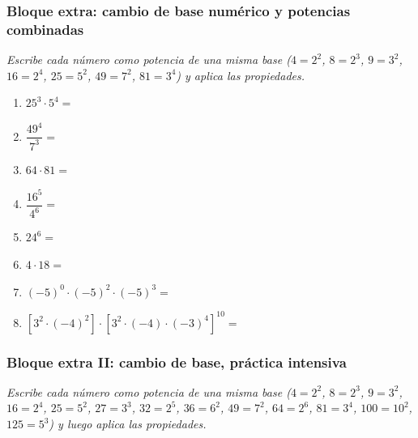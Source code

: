 \documentclass[12pt, letterpaper]{article}
\begin{document}
\subsubsection*{Bloque extra: cambio de base numérico y potencias combinadas}
\textit{Escribe cada número como potencia de una misma base ($4 = 2^2$, $8 = 2^3$, $9 = 3^2$, $16 = 2^4$, $25 = 5^2$, $49 = 7^2$, $81 = 3^4$) y aplica las propiedades.}

\begin{enumerate}[leftmargin=*, start=58]
  \item \facil{} $25^3 \cdot 5^4 =$

  \item \facil{} $\dfrac{49^4}{7^3} =$

  \item \medio{} $64 \cdot 81 =$

  \item \medio{} $\dfrac{16^5}{4^6} =$

  \item \medio{} $24^6 =$

  \item \medio{} $4 \cdot 18 =$

  \item \medio{} $(-5)^0 \cdot (-5)^2 \cdot (-5)^3 =$

  \item \dificil{} $\left[3^2 \cdot (-4)^2\right] \cdot \left[3^2 \cdot (-4) \cdot (-3)^4\right]^{10} =$
\end{enumerate}

\subsubsection*{Bloque extra II: cambio de base, práctica intensiva}
\textit{Escribe cada número como potencia de una misma base ($4 = 2^2$, $8 = 2^3$, $9 = 3^2$, $16 = 2^4$, $25 = 5^2$, $27 = 3^3$, $32 = 2^5$, $36 = 6^2$, $49 = 7^2$, $64 = 2^6$, $81 = 3^4$, $100 = 10^2$, $125 = 5^3$) y luego aplica las propiedades.}
\end{document}
